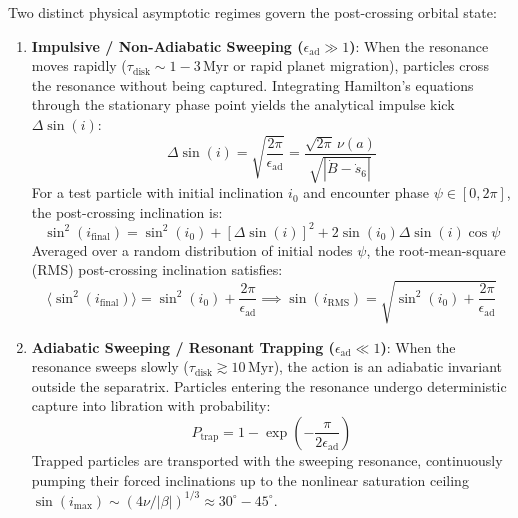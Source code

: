 \documentclass[11pt,a4paper]{article}
\begin{document}
Two distinct physical asymptotic regimes govern the post-crossing orbital state:
\begin{enumerate}
    \item \textbf{Impulsive / Non-Adiabatic Sweeping ($\epsilon_{\text{ad}} \gg 1$)}: When the resonance moves rapidly ($\tau_{\text{disk}} \sim 1 - 3\,\text{Myr}$ or rapid planet migration), particles cross the resonance without being captured. Integrating Hamilton's equations through the stationary phase point yields the analytical impulse kick $\Delta \sin(i)$:
    \begin{equation}
    \Delta \sin(i) = \sqrt{\frac{2\pi}{\epsilon_{\text{ad}}}} = \frac{\sqrt{2\pi}\,\nu(a)}{\sqrt{|\dot{B} - \dot{s}_6|}}
    \label{eq:impulse_kick}
    \end{equation}
    For a test particle with initial inclination $i_0$ and encounter phase $\psi \in [0, 2\pi]$, the post-crossing inclination is:
    \begin{equation}
    \sin^2(i_{\text{final}}) = \sin^2(i_0) + [\Delta\sin(i)]^2 + 2 \sin(i_0) \Delta\sin(i) \cos\psi
    \label{eq:phase_kick}
    \end{equation}
    Averaged over a random distribution of initial nodes $\psi$, the root-mean-square (RMS) post-crossing inclination satisfies:
    \begin{equation}
    \langle \sin^2(i_{\text{final}}) \rangle = \sin^2(i_0) + \frac{2\pi}{\epsilon_{\text{ad}}} \implies \sin(i_{\text{RMS}}) = \sqrt{\sin^2(i_0) + \frac{2\pi}{\epsilon_{\text{ad}}}}
    \label{eq:rms_inc}
    \end{equation}

    \item \textbf{Adiabatic Sweeping / Resonant Trapping ($\epsilon_{\text{ad}} \ll 1$)}: When the resonance sweeps slowly ($\tau_{\text{disk}} \gtrsim 10\,\text{Myr}$), the action is an adiabatic invariant outside the separatrix. Particles entering the resonance undergo deterministic capture into libration with probability:
    \begin{equation}
    P_{\text{trap}} = 1 - \exp\left(-\frac{\pi}{2 \epsilon_{\text{ad}}}\right)
    \label{eq:p_trap}
    \end{equation}
    Trapped particles are transported with the sweeping resonance, continuously pumping their forced inclinations up to the nonlinear saturation ceiling $\sin(i_{\text{max}}) \sim (4\nu / |\beta|)^{1/3} \approx 30^\circ - 45^\circ$.
\end{enumerate}
\end{document}
